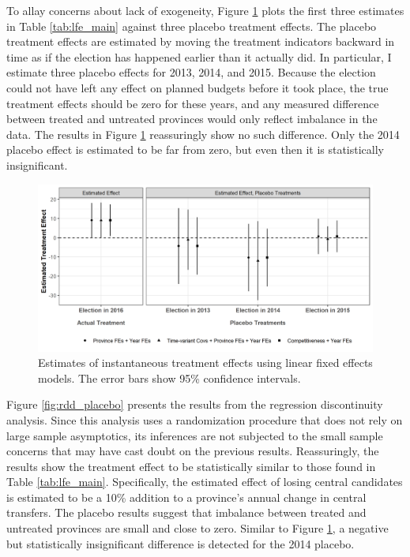 \documentclass[12pt]{article}
\newcommand{\1}{\mathbbm{1}}
\begin{document}
To allay concerns about lack of exogeneity, Figure \ref{fig:lfe_placebo} plots the first three estimates in Table \ref{tab:lfe_main} against three placebo treatment effects. The placebo treatment effects are estimated by moving the treatment indicators backward in time as if the election has happened earlier than it actually did. In particular, I estimate three placebo effects for 2013, 2014, and 2015. Because the election could not have left any effect on planned budgets before it took place, the true treatment effects should be zero for these years, and any measured difference between treated and untreated provinces would only reflect imbalance in the data. The results in Figure \ref{fig:lfe_placebo} reassuringly show no such difference. Only the 2014 placebo effect is estimated to be far from zero, but even then it is statistically insignificant.

\begin{figure}[!htbp]
	\centering
	\includegraphics[width=\textwidth]{figure/200205_lfe_placebo.png}
	\captionsetup{singlelinecheck=off}
	\caption[Estimated placebo linear fixed effects treatment effects]{Estimates of instantaneous treatment effects using linear fixed effects models. The error bars show 95\% confidence intervals.}
	\label{fig:lfe_placebo}
\end{figure}

Figure \ref{fig:rdd_placebo} presents the results from the regression discontinuity analysis. Since this analysis uses a randomization procedure that does not rely on large sample asymptotics, its inferences are not subjected to the small sample concerns that may have cast doubt on the previous results. Reassuringly, the results show the treatment effect to be statistically similar to those found in Table \ref{tab:lfe_main}. Specifically, the estimated effect of losing central candidates is estimated to be a 10\% addition to a province's annual change in central transfers. The placebo results suggest that imbalance between treated and untreated provinces are small and close to zero. Similar to Figure \ref{fig:lfe_placebo}, a negative but statistically insignificant difference is detected for the 2014 placebo. 
\end{document}
